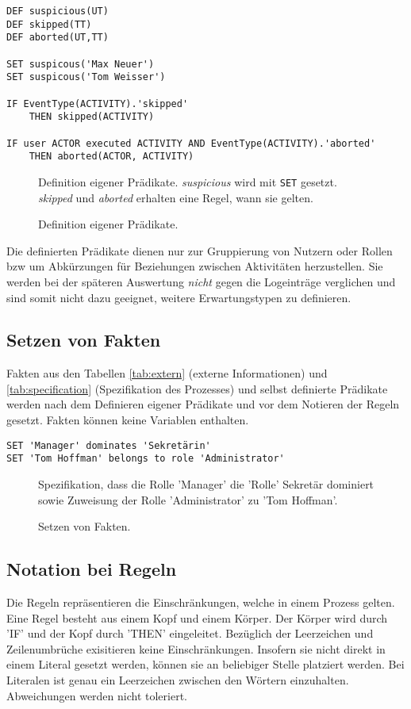 \begin{verbatim}
DEF suspicious(UT)
DEF skipped(TT)
DEF aborted(UT,TT)

SET suspicous('Max Neuer')
SET suspicous('Tom Weisser')

IF EventType(ACTIVITY).'skipped' 
    THEN skipped(ACTIVITY)

IF user ACTOR executed ACTIVITY AND EventType(ACTIVITY).'aborted' 
    THEN aborted(ACTOR, ACTIVITY)
\end{verbatim}
\begin{figure}[!h]
\small Definition eigener Prädikate. \textit{suspicious} wird mit \texttt{SET} gesetzt. \textit{skipped} und \textit{aborted} erhalten eine Regel, wann sie gelten.
\caption{Definition eigener Prädikate.}
\label{fig:define}
\end{figure}

Die definierten Prädikate dienen nur zur Gruppierung von Nutzern oder Rollen bzw um Abkürzungen für Beziehungen zwischen Aktivitäten herzustellen. Sie werden bei der späteren Auswertung \textit{nicht} gegen die Logeinträge verglichen und sind somit nicht dazu geeignet, weitere Erwartungstypen zu definieren.

\subsection{Setzen von Fakten}
\label{sec:set}
Fakten aus den Tabellen \ref{tab:extern} (externe Informationen) und \ref{tab:specification} (Spezifikation des Prozesses) und selbst definierte Prädikate werden nach dem Definieren eigener Prädikate und vor dem Notieren der Regeln gesetzt. Fakten können keine Variablen enthalten.

\begin{verbatim}
SET 'Manager' dominates 'Sekretärin'
SET 'Tom Hoffman' belongs to role 'Administrator' 
\end{verbatim}
\begin{figure}[!h]
\small Spezifikation, dass die Rolle 'Manager' die 'Rolle' Sekretär dominiert sowie Zuweisung der Rolle 'Administrator' zu 'Tom Hoffman'.
\caption{Setzen von Fakten.}
\label{fig:define}
\end{figure}


\subsection{Notation bei Regeln}
\label{sec:rules}
Die Regeln repräsentieren die Einschränkungen, welche in einem Prozess gelten. Eine Regel besteht aus einem Kopf und einem Körper. Der Körper wird durch 'IF' und der Kopf durch 'THEN' eingeleitet. Bezüglich der Leerzeichen und Zeilenumbrüche exisitieren keine Einschränkungen. Insofern sie nicht direkt in einem Literal gesetzt werden, können sie an beliebiger Stelle platziert werden. Bei Literalen ist genau ein Leerzeichen zwischen den Wörtern einzuhalten. Abweichungen werden nicht toleriert.

